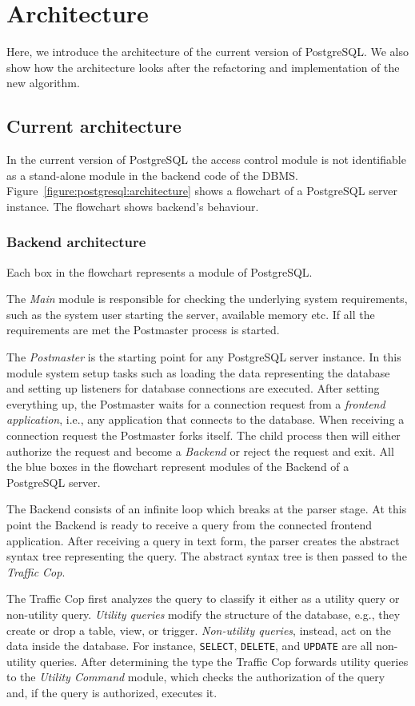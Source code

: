 \section{Architecture}


Here, we introduce the architecture of the current version of PostgreSQL.
%
We also show how the architecture looks after the refactoring and implementation of the new algorithm.
%
\subsection{Current architecture}
%
In the current version of PostgreSQL the access control module is not identifiable as a stand-alone module in the backend code of the DBMS.
%
Figure~\ref{figure:postgresql:architecture} shows a flowchart of a PostgreSQL server instance.
%
The flowchart shows backend's behaviour.
%
\subsubsection{Backend architecture}
%
Each box in the flowchart represents a module of PostgreSQL.

The \emph{Main} module is responsible for checking the underlying system requirements, such as the system user starting the server, available memory etc. If all the requirements are met the {Postmaster} process is started.

The \emph{Postmaster} is the starting point for any PostgreSQL server instance. 
%
In this module system setup tasks such as loading the data representing the database and setting up listeners for database connections are executed.
%
After setting everything up, the Postmaster waits for a connection request from a \emph{frontend application}, i.e., any application that connects to the database.
%
When receiving a connection request the Postmaster forks itself.
%
The child process then will either authorize the request and become a \emph{Backend} or reject the request and exit.
%
All the blue boxes in the flowchart represent modules of the Backend of a PostgreSQL server.

The Backend consists of an infinite loop which breaks at the parser stage.
%
At this point the Backend is ready to receive a query from the connected frontend application.
%
After receiving a query in text form, the parser creates the abstract syntax tree representing the query.
%
The abstract syntax tree is then passed to the \emph{Traffic Cop}.

The Traffic Cop first analyzes the query to classify it either as a {utility query} or {non-utility query}.
%
\emph{Utility queries} modify the structure of the database, e.g., they create or drop a table, view, or  trigger.
%
\emph{Non-utility queries}, instead, act on the data inside the database.
%
For instance, \texttt{SELECT}, \texttt{DELETE}, and \texttt{UPDATE} are all non-utility queries. 
%
After determining the type the Traffic Cop forwards utility queries to the \emph{Utility Command} module, which checks the authorization of the query and, if the query is authorized, executes it.

